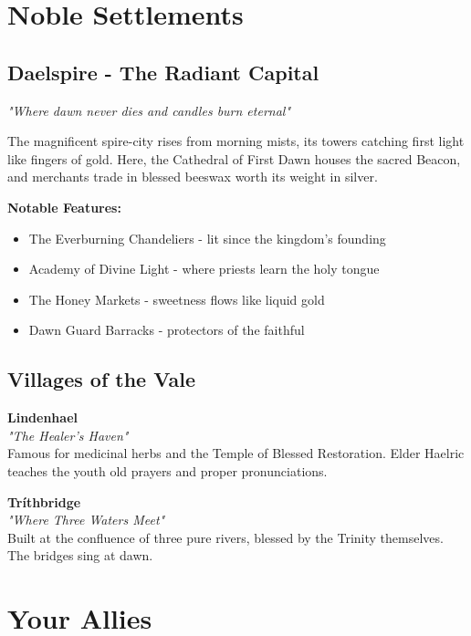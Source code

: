\documentclass[11pt,a4paper,twoside]{book}
\begin{document}
\section{Noble Settlements}

\subsection{Daelspire - The Radiant Capital}

\begin{tcolorbox}[heroicbox={Daelspire}]
\textit{"Where dawn never dies and candles burn eternal"}

The magnificent spire-city rises from morning mists, its towers catching first light like fingers of gold. Here, the Cathedral of First Dawn houses the sacred Beacon, and merchants trade in blessed beeswax worth its weight in silver.
\end{tcolorbox}

\textbf{Notable Features:}
\begin{itemize}
    \item The Everburning Chandeliers - lit since the kingdom's founding
    \item Academy of Divine Light - where priests learn the holy tongue
    \item The Honey Markets - sweetness flows like liquid gold
    \item Dawn Guard Barracks - protectors of the faithful
\end{itemize}

\subsection{Villages of the Vale}

\begin{multicols}{2}
\textbf{Lindenhael}\\
\textit{"The Healer's Haven"}\\
Famous for medicinal herbs and the Temple of Blessed Restoration. Elder Haelric teaches the youth old prayers and proper pronunciations.

\columnbreak

\textbf{Tríthbridge}\\
\textit{"Where Three Waters Meet"}\\
Built at the confluence of three pure rivers, blessed by the Trinity themselves. The bridges sing at dawn.
\end{multicols}

\section{Your Allies}
\end{document}
